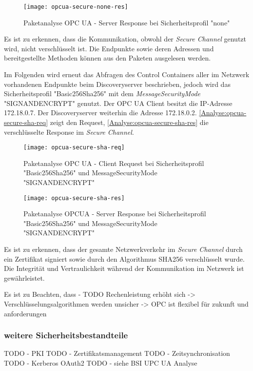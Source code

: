 \begin{figure}[h]
  \centering
  \texttt{[image: opcua-secure-none-res]}
  \caption{Paketanalyse OPC UA - Server Response bei Sicherheitsprofil "none"} 
  \label{Analyse:opcua-secure-none-res}
\end{figure}

\clearpage

Es ist zu erkennen, dass die Kommunikation, obwohl der \textit{Secure Channel} genutzt wird, nicht verschlüsselt ist. Die Endpunkte sowie deren Adressen und bereitgestellte Methoden können aus den Paketen ausgelesen werden.

Im Folgenden wird erneut das Abfragen des Control Containers aller im Netzwerk vorhandenen Endpunkte beim Discoveryserver beschrieben, jedoch wird das Sicherheitsprofil "Basic256Sha256" mit dem \textit{MessageSecurityMode} "SIGNANDENCRYPT" genutzt. Der \ac{OPC UA} Client besitzt die \ac{IP}-Adresse 172.18.0.7. Der Discoveryserver weiterhin die Adresse 172.18.0.2. \autoref{Analyse:opcua-secure-sha-req} zeigt den Request, \autoref{Analyse:opcua-secure-sha-res} die verschlüsselte Response im \textit{Secure Channel}.

\begin{figure}[h]
  \centering
  \texttt{[image: opcua-secure-sha-req]}
  \caption{Paketanalyse OPC UA - Client Request bei Sicherheitsprofil "Basic256Sha256" und MessageSecurityMode "SIGNANDENCRYPT"} 
  \label{Analyse:opcua-secure-sha-req}
\end{figure}

\begin{figure}[h]
  \centering
  \texttt{[image: opcua-secure-sha-res]}
  \caption{Paketanalyse OPCUA - Server Response bei Sicherheitsprofil "Basic256Sha256" und MessageSecurityMode "SIGNANDENCRYPT"} 
  \label{Analyse:opcua-secure-sha-res}
\end{figure}

\clearpage

Es ist zu erkennen, dass der gesamte Netzwerkverkehr im \textit{Secure Channel} durch ein Zertifikat signiert sowie durch den Algorithmus SHA256 verschlüsselt wurde. Die Integrität und Vertraulichkeit während der Kommunikation im Netzwerk ist gewährleistet.

Es ist zu Beachten, dass - TODO Rechenleistung erhöht sich -> Verschlüsselungsalgorithmen werden unsicher -> OPC ist flexibel für zukunft und anforderungen

\subsubsection{weitere Sicherheitsbestandteile}
TODO - PKI 
TODO - Zertifikatsmanagement 
TODO - Zeitsynchronisation
TODO - Kerberos OAuth2
TODO - siehe BSI UPC UA Analyse

